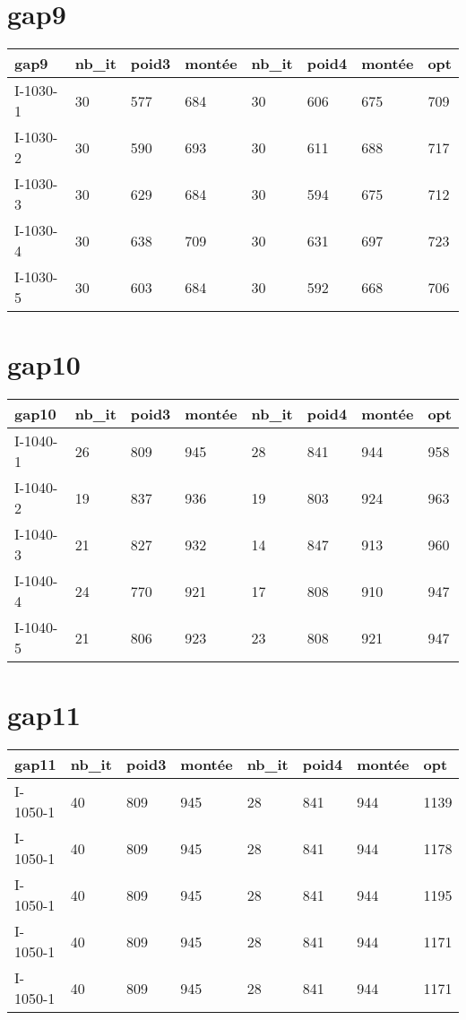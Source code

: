 \documentclass[a4paper,12pt,titlepage]{report}
\begin{document}
\section{gap9}

\begin{tabular}{|l|l|l|l|l|l|l|l|}
  \hline
  gap9 & nb\_it & poid3 & montée & nb\_it & poid4 & montée & opt \\
  \hline
  I-1030-1 & 30 & 577 & 684 & 30 & 606 & 675 & 709  \\
  I-1030-2 & 30 & 590 & 693 & 30 & 611 & 688 & 717  \\
  I-1030-3 & 30 & 629 & 684 & 30 & 594 & 675 & 712  \\
  I-1030-4 & 30 & 638 & 709 & 30 & 631 & 697 & 723  \\
  I-1030-5 & 30 & 603 & 684 & 30 & 592 & 668 & 706  \\
  \hline
\end{tabular}

\section{gap10}

\begin{tabular}{|l|l|l|l|l|l|l|l|}
  \hline
  gap10 & nb\_it & poid3 & montée & nb\_it & poid4 & montée & opt \\
  \hline
  I-1040-1 & 26 & 809 & 945 & 28 & 841 & 944 & 958  \\
  I-1040-2 & 19 & 837 & 936 & 19 & 803 & 924 & 963  \\
  I-1040-3 & 21 & 827 & 932 & 14 & 847 & 913 & 960  \\
  I-1040-4 & 24 & 770 & 921 & 17 & 808 & 910 & 947  \\
  I-1040-5 & 21 & 806 & 923 & 23 & 808 & 921 & 947  \\
  \hline
\end{tabular}

\section{gap11}

\begin{tabular}{|l|l|l|l|l|l|l|l|}
  \hline
  gap11 & nb\_it & poid3 & montée & nb\_it & poid4 & montée & opt \\
  \hline
  I-1050-1 & 40 & 809 & 945 & 28 & 841 & 944 & 1139  \\
  I-1050-1 & 40 & 809 & 945 & 28 & 841 & 944 & 1178  \\
  I-1050-1 & 40 & 809 & 945 & 28 & 841 & 944 & 1195  \\
  I-1050-1 & 40 & 809 & 945 & 28 & 841 & 944 & 1171  \\
  I-1050-1 & 40 & 809 & 945 & 28 & 841 & 944 & 1171  \\
  \hline
\end{tabular}
\end{document}
